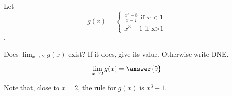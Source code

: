 \documentclass{ximera}
\author{Steven Gubkin}
\begin{document}
\begin{exercise}

Let \[g(x) = \begin{cases}  \frac{x^3 - 8}{x-2}  \text{ if $x<1$} \\ x^3+1 \text{ if  x>1}\end{cases}\].

Does $\lim_{x \to 2} g(x)$ exist?   If it does, give its value.  Otherwise write DNE.

\[\lim_{x \to 2} g(x) = \answer{9}\]

\begin{hint}
	Note that, close to $x=2$, the rule for $g(x)$ is $x^3+1$.
\end{hint}

\end{exercise}
\end{document}
